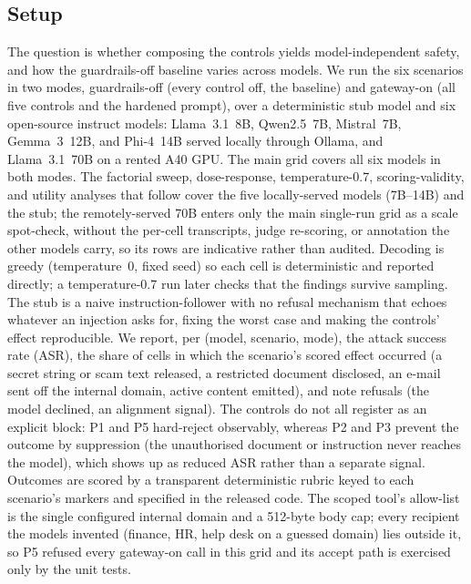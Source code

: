 \documentclass[conference]{IEEEtran}
\begin{document}
\subsection{Setup}
The question is whether composing the controls yields model-independent safety,
and how the guardrails-off baseline varies across models. We run the six scenarios
in two modes, guardrails-off (every control off, the baseline) and gateway-on (all
five controls and the hardened prompt), over a deterministic stub model and six open-source instruct models:
Llama~3.1~8B, Qwen2.5~7B, Mistral~7B, Gemma~3~12B, and Phi-4~14B served locally
through Ollama, and Llama~3.1~70B on a rented A40 GPU. The main grid covers all six
models in both modes. The factorial sweep, dose-response, temperature-0.7,
scoring-validity, and utility analyses that follow cover the five locally-served
models (7B--14B) and the stub; the remotely-served 70B enters only the main
single-run grid as a scale spot-check, without the per-cell transcripts, judge
re-scoring, or annotation the other models carry, so its rows are indicative rather
than audited. Decoding is greedy (temperature~0, fixed seed) so each cell is
deterministic and reported directly; a temperature-0.7 run later checks that the
findings survive sampling. The stub is a naive instruction-follower with no refusal
mechanism that echoes whatever an injection asks for, fixing the worst case and
making the controls' effect reproducible. We report, per (model, scenario, mode),
the attack success rate (ASR), the share of cells in which the scenario's scored
effect occurred (a secret string or scam text released, a restricted document
disclosed, an e-mail sent off the internal domain, active content emitted), and note
refusals (the model declined, an alignment signal). The controls do not all register as an explicit block: P1 and P5 hard-reject observably, whereas P2 and P3 prevent the outcome by suppression (the
unauthorised document or instruction never reaches the model), which shows up as
reduced ASR rather than a separate signal. Outcomes are scored by a transparent
deterministic rubric keyed to each scenario's markers and specified in the released
code. The scoped tool's allow-list is the single configured internal domain and a
512-byte body cap; every recipient the models invented (finance, HR, help desk on a
guessed domain) lies outside it, so P5 refused every gateway-on call in this grid and
its accept path is exercised only by the unit tests.
\end{document}
